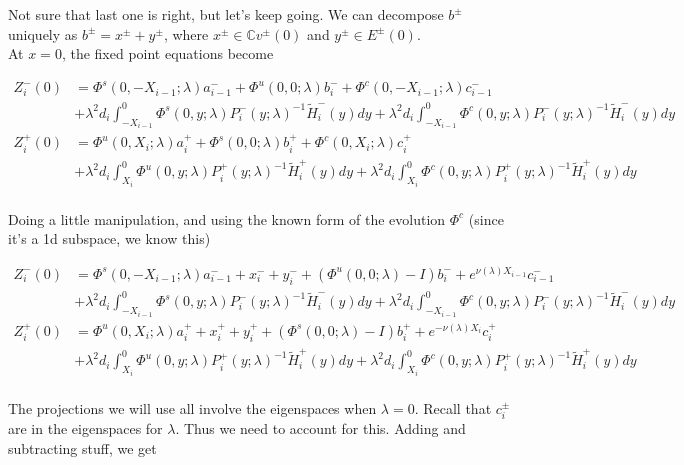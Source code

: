 \documentclass[12pt]{article}
\def\C{{\mathbb C}}
\begin{document}
Not sure that last one is right, but let's keep going. We can decompose $b^\pm$ uniquely as $b^\pm = x^\pm + y^\pm$, where $x^\pm \in \C v^\pm(0)$ and $y^\pm \in E^\pm(0)$.\\

At $x = 0$, the fixed point equations become

\begin{align*}
Z_i^-(0) &= \Phi^s(0, -X_{i-1}; \lambda) a_{i-1}^- + \Phi^u(0, 0; \lambda) b_i^- + \Phi^c(0, -X_{i-1}; \lambda) c_{i-1}^- \\
&+ \lambda^2 d_i \int_{-X_{i-1}}^0 \Phi^s(0, y; \lambda) P_i^-(y; \lambda)^{-1} \tilde{H}_i^-(y) dy 
+ \lambda^2 d_i \int_{-X_{i-1}}^0 \Phi^c(0, y; \lambda) P_i^-(y; \lambda)^{-1} \tilde{H}_i^-(y) dy  \\ 
Z_i^+(0) &= \Phi^u(0, X_i; \lambda) a_i^+ + \Phi^s(0, 0; \lambda) b_i^+ + \Phi^c(0, X_i; \lambda) c_i^+ \\
&+ \lambda^2 d_i \int_{X_i}^0 \Phi^u(0, y; \lambda) P_i^+(y; \lambda)^{-1} \tilde{H}_i^+(y) dy 
+ \lambda^2 d_i \int_{X_i}^0 \Phi^c(0, y; \lambda) P_i^+(y; \lambda)^{-1} \tilde{H}_i^+(y) dy \\
\end{align*}

Doing a little manipulation, and using the known form of the evolution $\Phi^c$ (since it's a 1d subspace, we know this)

\begin{align*}
Z_i^-(0) &= \Phi^s(0, -X_{i-1}; \lambda) a_{i-1}^- + x_i^- + y_i^- + (\Phi^u(0, 0; \lambda) - I)b_i^- + e^{\nu(\lambda) X_{i-1}} c_{i-1}^- \\
&+ \lambda^2 d_i \int_{-X_{i-1}}^0 \Phi^s(0, y; \lambda) P_i^-(y; \lambda)^{-1} \tilde{H}_i^-(y) dy 
+ \lambda^2 d_i \int_{-X_{i-1}}^0 \Phi^c(0, y; \lambda) P_i^-(y; \lambda)^{-1} \tilde{H}_i^-(y) dy  \\ 
Z_i^+(0) &= \Phi^u(0, X_i; \lambda) a_i^+ + x_i^+ + y_i^+ + (\Phi^s(0, 0; \lambda) - I) b_i^+ + e^{-\nu(\lambda)X_i} c_i^+ \\
&+ \lambda^2 d_i \int_{X_i}^0 \Phi^u(0, y; \lambda) P_i^+(y; \lambda)^{-1} \tilde{H}_i^+(y) dy 
+ \lambda^2 d_i \int_{X_i}^0 \Phi^c(0, y; \lambda) P_i^+(y; \lambda)^{-1} \tilde{H}_i^+(y) dy \\
\end{align*}

The projections we will use all involve the eigenspaces when $\lambda = 0$. Recall that $c_i^\pm$ are in the eigenspaces for $\lambda$. Thus we need to account for this. Adding and subtracting stuff, we get
\end{document}
